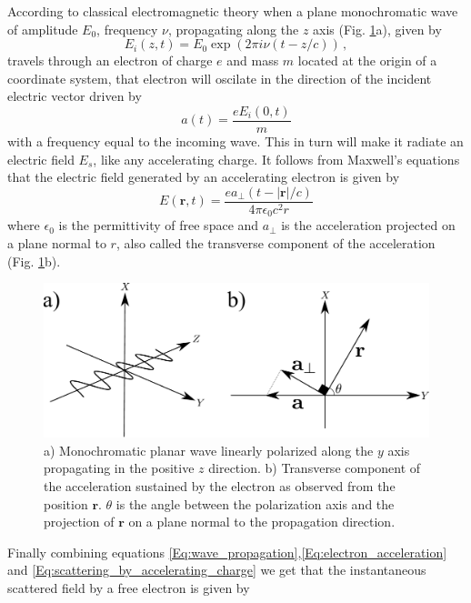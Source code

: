 According to classical electromagnetic theory when a plane monochromatic wave of
amplitude $E_0$, frequency $\nu$, propagating along the $z$ axis
(Fig. \ref{coordinate_axis}a), given by
\begin{equation}
E_i(z,t) = E_0 \exp(2 \pi i \nu (t-z/c)) \, ,
\label{Eq:wave_propagation}
\end{equation}
travels through an electron of charge $e$ and mass $m$ located at the origin of a coordinate
system, that electron will oscilate in the direction of the incident electric 
vector driven by
\begin{equation}
a(t) = \frac{e E_i(0,t)}{m}
\label{Eq:electron_acceleration}
\end{equation}
with a frequency equal to the incoming wave. This in turn will make it radiate
an electric field $E_s$, like any accelerating charge. It follows from Maxwell's
equations that the electric field generated by an accelerating electron is given by
\begin{equation}
E( \mathbf r,t) = \frac{e a_{\perp}(t - |\mathbf r|/c)}{4 \pi \epsilon_0 c^2 r}
\label{Eq:scattering_by_accelerating_charge}
\end{equation}
where  $\epsilon_0$ is the permittivity of free space and $a_{\perp}$ is the acceleration projected on a plane normal to $r$, also called the transverse component of the acceleration (Fig. \ref{coordinate_axis}b). 
\begin{figure}[h]
\centering
\includegraphics[width=1 \columnwidth]{coordinate_acceleration.pdf}
\caption{a) Monochromatic planar wave linearly polarized along the $y$ axis
  propagating in the positive $z$ direction. b) Transverse component of the
  acceleration sustained by the electron as observed from the position ${\mathbf r}$. $\theta$ is the angle between the polarization axis and the projection of $\mathbf r$ on a plane normal to the propagation direction.}
\label{coordinate_axis}
\end{figure}
Finally combining equations \ref{Eq:wave_propagation},\ref{Eq:electron_acceleration} and \ref{Eq:scattering_by_accelerating_charge} we get that the instantaneous scattered field by a free electron is given by

